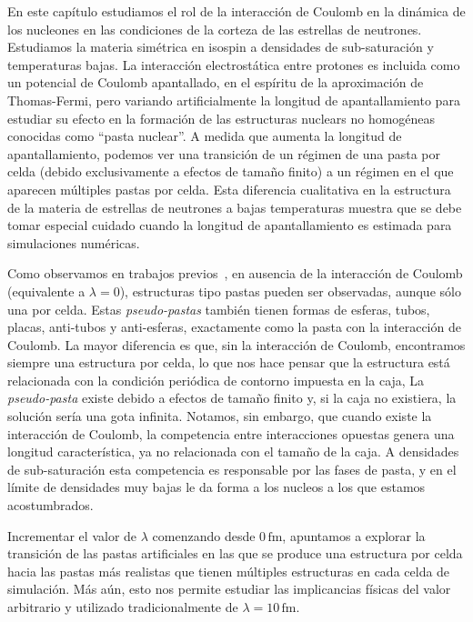 En este capítulo estudiamos el rol de la interacción de Coulomb en la dinámica de los nucleones en las condiciones de la corteza de las estrellas de neutrones.
Estudiamos la materia simétrica en isospin a densidades de sub-saturación y temperaturas bajas.
La interacción electrostática entre protones es incluida como un potencial de Coulomb apantallado, en el espíritu de la aproximación de Thomas-Fermi, pero variando artificialmente la longitud de apantallamiento para estudiar su efecto en la formación de las estructuras nuclears no homogéneas conocidas como ``pasta nuclear''.
A medida que aumenta la longitud de apantallamiento, podemos ver una transición de un régimen de una pasta por celda (debido exclusivamente a efectos de tamaño finito) a un régimen en el que aparecen múltiples pastas por celda.
Esta diferencia cualitativa en la estructura de la materia de estrellas de neutrones a bajas temperaturas muestra que se debe tomar especial cuidado cuando la longitud de apantallamiento es estimada para simulaciones numéricas.

Como observamos en trabajos previos~\cite{schneider_nuclear_2013,gimenez_molinelli_simulations_2014}, en ausencia de la interacción de Coulomb (equivalente a $\lambda=0$), estructuras tipo pastas pueden ser observadas, aunque sólo una por celda.
Estas \emph{pseudo-pastas} también tienen formas de esferas, tubos, placas, anti-tubos y anti-esferas, exactamente como la pasta con la interacción de Coulomb.
La mayor diferencia es que, sin la interacción de Coulomb, encontramos siempre una estructura por celda, lo que nos hace pensar que la estructura está relacionada con la condición periódica de contorno impuesta en la caja,
La \emph{pseudo-pasta} existe debido a efectos de tamaño finito y, si la caja no existiera, la solución sería una gota infinita.
Notamos, sin embargo, que cuando existe la interacción de Coulomb, la competencia entre interacciones opuestas genera una longitud característica, ya no relacionada con el tamaño de la caja.
A densidades de sub-saturación esta competencia es responsable por las fases de pasta, y en el límite de densidades muy bajas le da forma a los nucleos a los que estamos acostumbrados.

Incrementar el valor de $\lambda$ comenzando desde $0\,\text{fm}$, apuntamos a explorar la transición de las pastas artificiales en las que se produce una estructura por celda hacia las pastas más realistas que tienen múltiples estructuras en cada celda de simulación.
Más aún, esto nos permite estudiar las implicancias físicas del valor arbitrario y utilizado tradicionalmente de $\lambda=10\,\text{fm}$.

